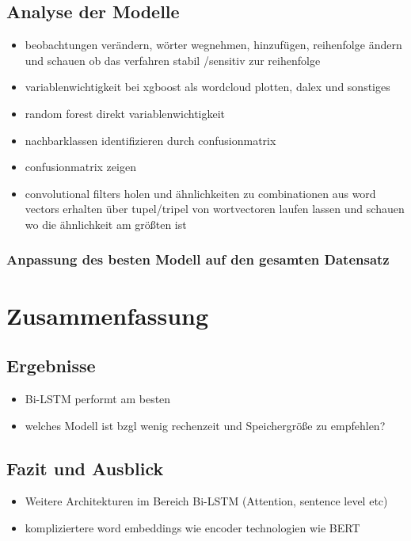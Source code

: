 \documentclass[a4paper,11pt]{article}
\begin{document}
\subsection{Analyse der Modelle}

\begin{itemize}

    \item beobachtungen verändern, wörter wegnehmen, hinzufügen, reihenfolge ändern und schauen ob das verfahren stabil /sensitiv zur reihenfolge
    \item variablenwichtigkeit bei xgboost als wordcloud plotten, dalex und sonstiges
    \item random forest direkt variablenwichtigkeit
    \item nachbarklassen identifizieren durch confusionmatrix
    \item confusionmatrix zeigen
    \item convolutional filters holen und ähnlichkeiten zu combinationen aus word vectors erhalten über tupel/tripel von wortvectoren laufen lassen und schauen wo die ähnlichkeit am größten ist
\end{itemize}{}

\subsubsection{Anpassung des besten Modell auf den gesamten Datensatz}

\section{Zusammenfassung}

\subsection{Ergebnisse}

\begin{itemize}
    \item Bi-LSTM performt am besten
    \item welches Modell ist bzgl wenig rechenzeit und Speichergröße zu empfehlen?
\end{itemize}{}



\subsection{Fazit und Ausblick}

\begin{itemize}
    \item Weitere Architekturen im Bereich Bi-LSTM (Attention, sentence level etc)
    \item kompliziertere word embeddings wie encoder technologien wie BERT
\end{itemize}


\newpage
\end{document}
